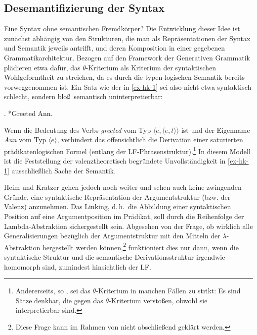 {\subsection{Desemantifizierung der Syntax}

Eine Syntax ohne semantischen Fremdkörper? Die Entwicklung dieser Idee ist zunächst abhängig von den Strukturen, die man als Repräsentationen der Syntax und Semantik jeweils antrifft, und deren Komposition in einer gegebenen Grammatikarchitektur. Bezogen auf den Framework der Generativen Grammatik plädieren etwa \citet[Kapitel~3]{Heim:Kratzer:98} dafür, das $\theta$-Kriterium als Kriterium der syntaktischen Wohlgeformtheit zu streichen, da es durch die typen-logischen Semantik bereits vorweggenommen ist. Ein Satz wie der in \ref{ex-hk-1} sei also nicht etwa syntaktisch schlecht, sondern blo\ss\  semantisch uninterpretierbar:

\ex. \label{ex-hk-1} *Greeted Ann.  \hfill \citep[50]{Heim:Kratzer:98}

Wenn die Bedeutung des Verbs {\it greeted} vom Typ $\langle e,\langle e,t \rangle \rangle$ ist und der Eigenname {\it Ann} vom Typ $\langle e \rangle$, verhindert das offensichtlich die Derivation einer saturierten prädikatenlogischen Formel (entlang der  LF-Phrasenstruktur).\footnote{Andererseits, so \citet[51f]{Heim:Kratzer:98}, sei das $\theta$-Kriterium in manchen Fällen zu strikt: Es sind Sätze denkbar, die gegen das $\theta$-Kriterium versto\ss en, obwohl sie interpretierbar sind.} In diesem Modell ist die Feststellung der valenztheoretisch begründete Unvollständigkeit in \ref{ex-hk-1} ausschlie\ss lich Sache der Semantik.

Heim und Kratzer gehen jedoch noch weiter und sehen auch keine zwingenden Gründe, eine syntaktische Repräsentation der Argumentstruktur (bzw. der Valenz) anzunehmen. Das Linking, d.\,h.\ die Abbildung einer syntaktischen Position auf eine Argumentposition im Prädikat, soll durch die Reihenfolge der Lambda-Abstraktion sichergestellt sein. Abgesehen von der Frage, ob wirklich alle Generalisierungen bezüglich der Argumentstruktur mit den Mitteln der $\lambda$-Abstraktion hergestellt werden können,\footnote{Diese Frage kann im Rahmen von \cite{Heim:Kratzer:98} nicht abschlie\ss end geklärt werden.} funktioniert dies nur dann, wenn die syntaktische Struktur und die semantische Derivationsstruktur irgendwie homomorph sind, zumindest hinsichtlich der LF.  

}
